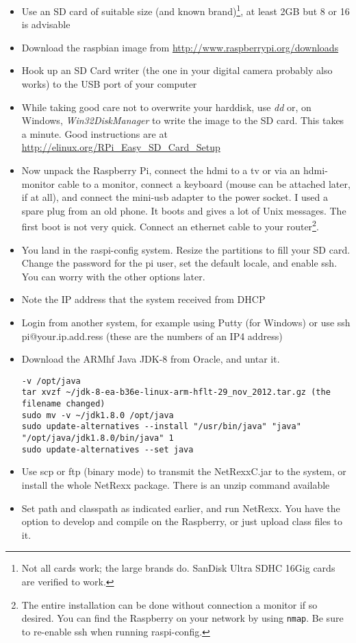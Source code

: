 \begin{itemize}
\item Use an SD card of suitable size (and known brand)\footnote{Not all cards work; the large brands do. SanDisk Ultra SDHC 16Gig cards are verified to work.}, at least 2GB but 8 or 16 is advisable
\item Download the raspbian image from \url{http://www.raspberrypi.org/downloads}
\item Hook up an SD Card writer (the one in your digital camera probably also works) to the USB port of your computer
\item While taking good care not to overwrite your harddisk, use \emph{dd} or, on Windows, \emph{Win32DiskManager} to write the image to the SD card. This takes a minute. Good instructions are at \url{http://elinux.org/RPi_Easy_SD_Card_Setup}
\item Now unpack the Raspberry Pi, connect the hdmi to a tv or via an hdmi-monitor cable to a monitor, connect a keyboard (mouse can be attached later, if at all), and connect the mini-usb adapter to the power socket. I used a spare plug from an old phone. It boots and gives a lot of Unix messages. The first boot is not very quick. Connect an ethernet cable to your router\footnote{The entire installation can be done without connection a monitor if so desired. You can find the Raspberry on your network by using \texttt{nmap}. Be sure to re-enable ssh when running raspi-config.}.
\item You land in the raspi-config system. Resize the partitions to fill your SD card. Change the password for the pi user, set the default locale, and enable ssh. You can worry with the other options later.
\item Note the IP address that the system received from DHCP
\item Login from another system, for example using Putty (for Windows) or use ssh pi@your.ip.add.ress (these are the numbers of an IP4 address)
\item Download the ARMhf Java JDK-8 from Oracle, and untar it.
\begin{verbatim}
-v /opt/java 
tar xvzf ~/jdk-8-ea-b36e-linux-arm-hflt-29_nov_2012.tar.gz (the filename changed) 
sudo mv -v ~/jdk1.8.0 /opt/java 
sudo update-alternatives --install "/usr/bin/java" "java" "/opt/java/jdk1.8.0/bin/java" 1 
sudo update-alternatives --set java 
\end{verbatim}
\item Use scp or ftp (binary mode) to transmit the NetRexxC.jar to the system, or install the whole NetRexx package. There is an unzip command available
\item Set path and classpath as indicated earlier, and run NetRexx. You have the option to develop and compile on the Raspberry, or just upload class files to it.
\end{itemize}